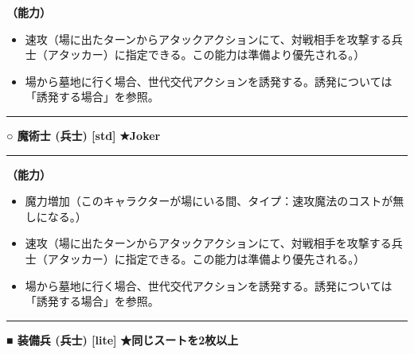 \documentclass[twocolumn,a5paper,papersize,10pt]{jarticle}
\begin{document}
{\bf（能力）}


\vspace{-1zh}%
\begin{itemize}
\setlength{\leftskip}{-0.3cm}
\setlength{\parskip}{0pt} %

\item 速攻（場に出たターンからアタックアクションにて、対戦相手を攻撃する兵士（アタッカー）に指定できる。この能力は準備より優先される。）

\item 場から墓地に行く場合、世代交代アクションを誘発する。誘発については「誘発する場合」を参照。
\vspace{-1zh}%
\end{itemize}
\vspace{2mm} %
\hrule height 0.5mm depth 0mm width 66.5mm %
\vspace{1mm} %
{\small\bf ○ 魔術士 {\scriptsize (兵士) [std]}} %
\hfill 
{\footnotesize\bf ★Joker }

\vspace{1mm}%
\hrule height 0.1mm depth 0mm width 66.5mm %
\vspace{1mm}%

{\bf（能力）}


\vspace{-1zh}%
\begin{itemize}
\setlength{\leftskip}{-0.3cm}
\setlength{\parskip}{0pt} %

\item 魔力増加（このキャラクターが場にいる間、タイプ：速攻魔法のコストが無しになる。）

\item 速攻（場に出たターンからアタックアクションにて、対戦相手を攻撃する兵士（アタッカー）に指定できる。この能力は準備より優先される。）

\item 場から墓地に行く場合、世代交代アクションを誘発する。誘発については「誘発する場合」を参照。
\vspace{-1zh}%
\end{itemize}
\vspace{2mm} %
\hrule height 0.5mm depth 0mm width 66.5mm %
\vspace{1mm} %
{\small\bf ■ 装備兵 {\scriptsize (兵士) [lite]}} %
\hfill 
{\footnotesize\bf ★同じスートを2枚以上 }
\end{document}
